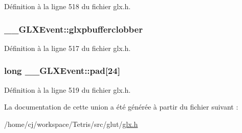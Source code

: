 Définition à la ligne 518 du fichier glx.\-h.

\hypertarget{union_____g_l_x_event_ada5880e2b424bcb2f60a411aaf713fae}{
\subsubsection[{glxpbufferclobber}]{ \-\_\-\-\_\-\-G\-L\-X\-Event\-::glxpbufferclobber}}\label{union_____g_l_x_event_ada5880e2b424bcb2f60a411aaf713fae}


Définition à la ligne 517 du fichier glx.\-h.

\hypertarget{union_____g_l_x_event_a1cb8f6e7e77a34d25baf43b3f3bc2d4f}{
\subsubsection[{pad}]{\setlength{\rightskip}{0pt plus 5cm}long \-\_\-\-\_\-\-G\-L\-X\-Event\-::pad\mbox{[}24\mbox{]}}}\label{union_____g_l_x_event_a1cb8f6e7e77a34d25baf43b3f3bc2d4f}


Définition à la ligne 519 du fichier glx.\-h.



La documentation de cette union a été générée à partir du fichier suivant \-:\begin{DoxyCompactItemize}
\item 
/home/cj/workspace/\-Tetris/src/glut/\hyperlink{glx_8h}{glx.\-h}\end{DoxyCompactItemize}
